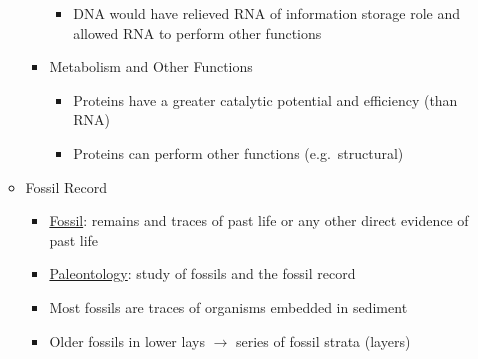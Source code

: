 \documentclass[12pt]{article}
\begin{document}
\begin{itemize}
\begin{itemize}
\begin{itemize}
\begin{itemize}
                    \item DNA would have relieved RNA of information storage role and allowed RNA to perform other functions
                \end{itemize}
                \item Metabolism and Other Functions
                \begin{itemize}
                    \item Proteins have a greater catalytic potential and efficiency (than RNA)
                    \item Proteins can perform other functions (e.g.\ structural)
                \end{itemize}
            \end{itemize}
            \item Fossil Record
            \begin{itemize}
                \item \underline{Fossil}: remains and traces of past life or any other direct evidence of past life
                \item \underline{Paleontology}: study of fossils and the fossil record
                \item Most fossils are traces of organisms embedded in sediment
                \item Older fossils in lower lays $\rightarrow$ series of fossil strata (layers)
            \end{itemize}
        \end{itemize}
    \end{itemize}
\end{document}
